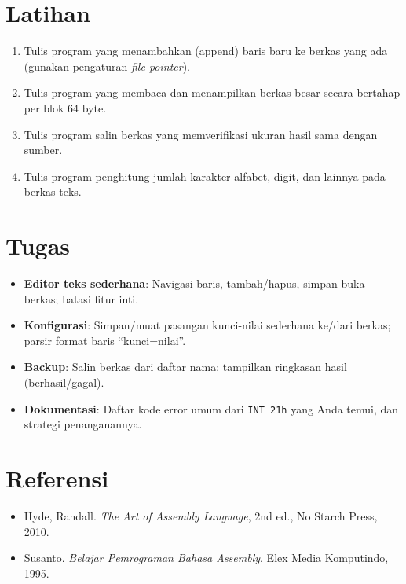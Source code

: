 \section{Latihan}
\begin{enumerate}
  \item Tulis program yang menambahkan (append) baris baru ke berkas yang ada (gunakan pengaturan \textit{file pointer}).
  \item Tulis program yang membaca dan menampilkan berkas besar secara bertahap per blok 64 byte.
  \item Tulis program salin berkas yang memverifikasi ukuran hasil sama dengan sumber.
  \item Tulis program penghitung jumlah karakter alfabet, digit, dan lainnya pada berkas teks.
\end{enumerate}

\section{Tugas}
\begin{itemize}
  \item \textbf{Editor teks sederhana}: Navigasi baris, tambah/hapus, simpan-buka berkas; batasi fitur inti.
  \item \textbf{Konfigurasi}: Simpan/muat pasangan kunci-nilai sederhana ke/dari berkas; parsir format baris ``kunci=nilai''.
  \item \textbf{Backup}: Salin berkas dari daftar nama; tampilkan ringkasan hasil (berhasil/gagal).
  \item \textbf{Dokumentasi}: Daftar kode error umum dari \texttt{INT 21h} yang Anda temui, dan strategi penanganannya.
\end{itemize}

\section{Referensi}
\begin{itemize}
  \item Hyde, Randall. \textit{The Art of Assembly Language}, 2nd ed., No Starch Press, 2010.
  \item Susanto. \textit{Belajar Pemrograman Bahasa Assembly}, Elex Media Komputindo, 1995.
\end{itemize}
